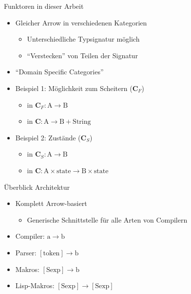 \documentclass{beamer}
\newcommand{\pfeil}{\item[$\Rightarrow$]}
\newcommand\ato{\rightarrow} %
\begin{document}
\begin{frame}{Funktoren in dieser Arbeit}
  \begin{itemize}
  \item Gleicher Arrow in verschiedenen Kategorien
    \begin{itemize}
    \item Unterschiedliche Typsignatur möglich
      \pfeil ``Verstecken'' von Teilen der Signatur
    \end{itemize}
  \item ``Domain Specific Categories''
  \item Beispiel 1: Möglichkeit zum Scheitern ($\mathbf{C}_F$)
    \begin{itemize}
    \item in $\mathbf{C}_F: \mathrm{A} \ato \mathrm{B}$
    \item in $\mathbf{C}: \mathrm{A} \ato \mathrm{B} + \mathrm{String}$
    \end{itemize}
  \item Beispiel 2: Zustände ($\mathbf{C}_S$)
    \begin{itemize}
    \item in $\mathbf{C}_S: \mathrm{A} \ato \mathrm{B}$
    \item in $\mathbf{C}: \mathrm{A} \times \mathrm{state} \ato \mathrm{B} \times \mathrm{state}$
    \end{itemize}
  \end{itemize}
\end{frame}

\begin{frame}{Überblick Architektur}
  \begin{itemize}
  \item Komplett Arrow-basiert
    \begin{itemize}
      \pfeil Generische Schnittstelle für alle Arten von Compilern
    \end{itemize}
  \item Compiler: $\mathrm{a} \ato \mathrm{b}$
  \item Parser: $\mathrm{[token]} \ato \mathrm{b}$ 
  \item Makros: $\mathrm{[Sexp]} \ato \mathrm{b}$ 
  \item Lisp-Makros: $\mathrm{[Sexp]} \ato \mathrm{[Sexp]}$
  \end{itemize}
\end{frame}
\end{document}
